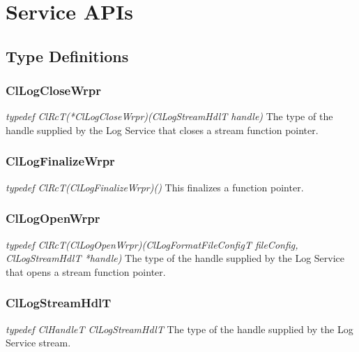 \chapter{Service APIs}
\section{Type Definitions}



\subsection{ClLogCloseWrpr}
\textit{typedef Cl\-Rc\-T(*Cl\-Log\-Close\-Wrpr)(Cl\-Log\-Stream\-Hdl\-T handle)}
\newline
\newline
The type of the handle supplied by the Log Service that closes a stream function pointer.

\subsection{ClLogFinalizeWrpr}
\textit{typedef Cl\-Rc\-T(Cl\-Log\-Finalize\-Wrpr)()}
\newline
\newline
This finalizes a function pointer. 


\subsection{ClLogOpenWrpr}
\textit{typedef Cl\-Rc\-T(Cl\-Log\-Open\-Wrpr)(Cl\-Log\-Format\-File\-Config\-T file\-Config, Cl\-Log\-Stream\-Hdl\-T *handle)}
\newline
\newline
The type of the handle supplied by the Log Service that opens a stream function pointer.



\subsection{ClLogStreamHdlT}
\textit{typedef Cl\-Handle\-T Cl\-Log\-Stream\-Hdl\-T}
\newline
\newline
The type of the handle supplied by the Log Service stream.



